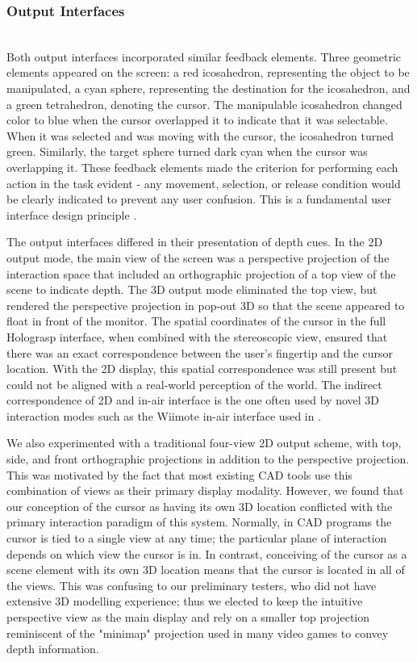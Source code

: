 \documentclass[pageno]{jpaper}
\begin{document}
\subsubsection{Output Interfaces}$ $\\
Both output interfaces incorporated similar feedback elements. Three geometric elements
appeared on the screen: a red icosahedron, representing the object to be manipulated, a
cyan sphere, representing the destination for the icosahedron, and a green tetrahedron, 
denoting the cursor. The manipulable icosahedron changed color to blue when the cursor
overlapped it to indicate that it was selectable. When it was selected and was moving
with the cursor, the icosahedron turned green. Similarly, the target sphere turned dark
cyan when the cursor was overlapping it. These feedback elements made the criterion for
performing each action in the task evident -
any movement, selection, or release condition would be clearly indicated to prevent any user
confusion. This is a fundamental user interface design principle \cite{bravenuiworld}.

The output interfaces differed in their presentation of depth cues. In the 2D output mode,
the main view of the screen was a perspective projection of the interaction space that
included an orthographic projection of a top view of the scene to indicate depth. The 3D output mode eliminated the top
view, but rendered the perspective projection in pop-out 3D so that the scene appeared to
float in front of the monitor. The spatial coordinates of the cursor in the full Holograsp interface, when combined
with the stereoscopic view, ensured that there was an exact correspondence between the user's fingertip
and the cursor location. With the 2D display, this spatial correspondence was still present but could not
be aligned with a real-world perception of the world. The indirect correspondence of 2D and in-air interface is the one
often used by novel 3D interaction modes such as the Wiimote in-air interface used in \cite{study1}.

We also experimented with a traditional four-view 2D output
scheme, with top, side, and front orthographic projections in addition to the perspective projection.
This was motivated by the fact that most existing CAD tools use this combination of views as their
primary display modality. However, we found that our conception of the cursor as having its own
3D location conflicted with the primary interaction paradigm of this system. Normally, in CAD programs
the cursor is tied to a single view at any time; the particular plane of interaction depends on which view
the cursor is in. In contrast, conceiving of the cursor as a scene element with its own 3D location means
that the cursor is located in all of the views. This was confusing to our preliminary testers, who did not
have extensive 3D modelling experience; thus we elected to keep the intuitive perspective view as the
main display and rely on a smaller top projection reminiscent of the "minimap" projection used in many
video games to convey depth information.
\end{document}
